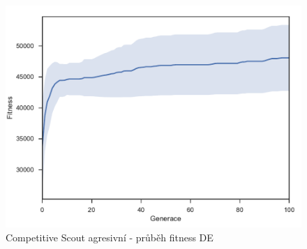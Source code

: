 \begin{figure}[h]\centering
	\includegraphics[width=0.75\columnwidth]{../img/CompetitiveMap/ScoutAgresive}
	\caption{Competitive Scout agresivní - průběh fitness DE}
	\label{obr04:CompetitiveAgresive}
\end{figure}
\clearpage
